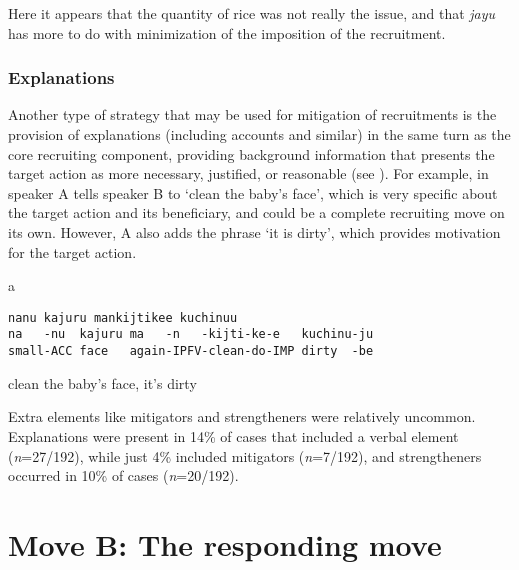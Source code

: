\documentclass[output=paper]{langsci/langscibook}
\begin{document}
Here it appears that the quantity of rice was not really the issue, and that \textit{jayu} has more to do with minimization of the imposition of the recruitment.

\subsubsection{Explanations}\label{sec:floyd:3.4.2}

Another type of strategy that may be used for mitigation of recruitments is the provision of explanations (including accounts and similar) in the same turn as the core recruiting component, providing background information that presents the target action as more necessary, justified, or reasonable (see \citealt{Parry2013,BaranovaDingemanse2016}). For example, in  speaker A tells speaker B to ‘clean the baby's face’, which is very specific about the target action and its beneficiary, and could be a complete recruiting move on its own. However, A also adds the phrase ‘it is dirty’, which provides motivation for the target action.

\vspace{-1mm}
%
\begin{mdframednoverticalspace}[style=firstfoc]
\begin{transbox}{1}{a}
\begin{verbatim}
nanu kajuru mankijtikee kuchinuu
na   -nu  kajuru ma   -n   -kijti-ke-e   kuchinu-ju
small-ACC face   again-IPFV-clean-do-IMP dirty  -be
\end{verbatim}
clean the baby's face, it's dirty
\end{transbox}
\end{mdframednoverticalspace}
%
\begin{mdframednoverticalspace}[style=secondfoc]
\end{mdframednoverticalspace}

Extra elements like mitigators and strengtheners were relatively uncommon. Explanations were present in 14\% of cases that included a verbal element (\textit{n}=27{\slash}192), while just 4\% included mitigators (\textit{n}=7/192), and strengtheners occurred in 10\% of cases (\textit{n}=20/192).

\section{Move B: The responding move}\label{sec:floyd:4}
\end{document}
